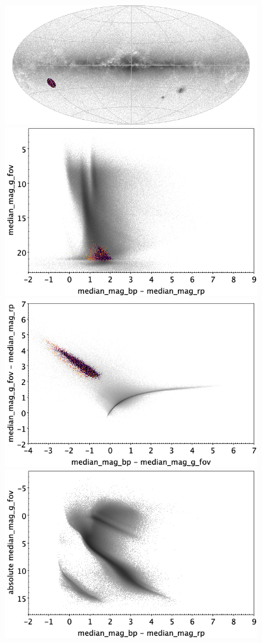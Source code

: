 \documentclass[longauth]{aa}
\begin{document}
\begin{appendix}
\begin{figure}
\centering
{}
\includegraphics[width=0.6\hsize]{figures/appendix/GALAXY_cls_sky.png} 
 \\ %
\vspace{4mm}
 \includegraphics[width=0.45\hsize]{figures/appendix/GALAXY_cls_cm.png}  %
\hspace{2mm}
 \includegraphics[width=0.45\hsize]{figures/appendix/GALAXY_cls_cc.png} \\ %
\vspace{4mm}
 \includegraphics[width=0.45\hsize]{figures/appendix/GALAXY_cls_cam.png}  %

\end{figure}
\end{appendix}
\end{document}
